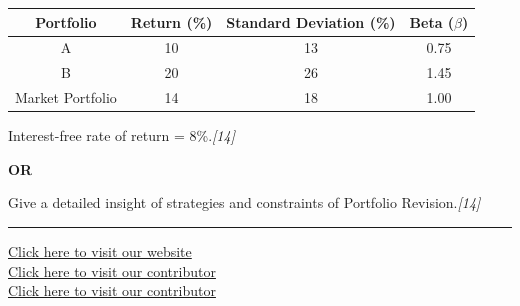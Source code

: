 \documentclass[11pt,a4paper]{article}
\newcommand{\pts}[1]{\hfill   \textit{[#1]}}
\begin{document}
\begin{center}

\begin{tabular}{|c|c|c|c|}
\hline
   \textbf{Portfolio} &   \textbf{Return (\%)} &   \textbf{Standard Deviation (\%)} &   \textbf{Beta ($\beta$)} \\ \hline
A & 10 & 13 & 0.75 \\ \hline
B & 20 & 26 & 1.45 \\ \hline
Market Portfolio & 14 & 18 & 1.00 \\ \hline
\end{tabular}
\end{center}
Interest-free rate of return = 8\%.\pts{14}

\centerline{   \textbf{OR}}

Give a detailed insight of strategies and constraints of Portfolio Revision.\pts{14}

\vfill
\rule{\linewidth}{0.4pt}

\begin{center}\small
\href{https://bhu-exam.vercel.app/}{Click here to visit our website}\\[4pt]
\href{https://me-aryan.vercel.app/}{Click here to visit our contributor}\\[4pt]
\href{https://quashan-me.vercel.app/}{Click here to visit our contributor}
\end{center}
\end{document}
